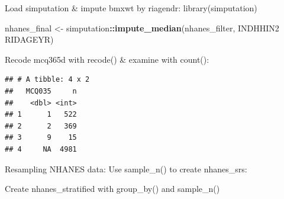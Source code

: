 \documentclass[]{book}
\newenvironment{Shaded}{\begin{snugshade}}{\end{snugshade}}
\newcommand{\DataTypeTok}[1]{\textcolor[rgb]{0.13,0.29,0.53}{#1}}
\newcommand{\DecValTok}[1]{\textcolor[rgb]{0.00,0.00,0.81}{#1}}
\newcommand{\KeywordTok}[1]{\textcolor[rgb]{0.13,0.29,0.53}{\textbf{#1}}}
\newcommand{\NormalTok}[1]{#1}
\newcommand{\OperatorTok}[1]{\textcolor[rgb]{0.81,0.36,0.00}{\textbf{#1}}}
\newcommand{\OtherTok}[1]{\textcolor[rgb]{0.56,0.35,0.01}{#1}}
\newcommand{\StringTok}[1]{\textcolor[rgb]{0.31,0.60,0.02}{#1}}
\begin{document}
Load simputation \& impute bmxwt by riagendr: library(simputation)

\begin{Shaded}
\begin{Highlighting}[]
\NormalTok{nhanes_final <-}\StringTok{ }\NormalTok{simputation}\OperatorTok{::}\KeywordTok{impute_median}\NormalTok{(nhanes_filter, INDHHIN2 }\OperatorTok{~}\StringTok{ }\NormalTok{RIDAGEYR)}
\end{Highlighting}
\end{Shaded}

Recode mcq365d with recode() \& examine with count():

\begin{Shaded}
\end{Shaded}

\begin{verbatim}
## # A tibble: 4 x 2
##   MCQ035     n
##    <dbl> <int>
## 1      1   522
## 2      2   369
## 3      9    15
## 4     NA  4981
\end{verbatim}

Resampling NHANES data:
Use sample\_n() to create nhanes\_srs:

\begin{Shaded}
\end{Shaded}

Create nhanes\_stratified with group\_by() and sample\_n()

\begin{Shaded}
\end{Shaded}
\end{document}
